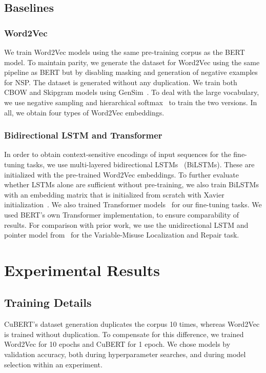 \documentclass{article}
\newcommand{\BERTforCode}{CuBERT\xspace}
\begin{document}
\subsection{Baselines}

\subsubsection{Word2Vec}
We train Word2Vec models using the same pre-training corpus as the BERT model. To maintain parity, we generate the dataset for Word2Vec using the same pipeline as BERT but by disabling masking and generation of negative examples for NSP. The dataset is generated without any duplication.
We train both CBOW and Skipgram models using GenSim~\citep{rehurek_lrec}. To deal with the large vocabulary, we use negative sampling and hierarchical softmax~\citep{DBLP:journals/corr/abs-1301-3781,NIPS2013_5021} to train the two versions. In all, we obtain four types of Word2Vec embeddings.

\subsubsection{Bidirectional LSTM and Transformer}
In order to obtain context-sensitive encodings of input sequences for the fine-tuning tasks, we use multi-layered bidirectional LSTMs~\citep{Hochreiter:1997:LSM:1246443.1246450} (BiLSTMs). These are initialized with the pre-trained Word2Vec embeddings. To further evaluate whether LSTMs alone are sufficient without pre-training, we also train BiLSTMs with an embedding matrix that is initialized from scratch with Xavier initialization~\citep{glorot2010understanding}. We also trained Transformer models~\citep{NIPS2017_7181} for our fine-tuning tasks. We used BERT's own Transformer implementation, to ensure comparability of results. {For comparison with prior work, we use the unidirectional LSTM and pointer model from~\citet{DBLP:journals/corr/abs-1904-01720} for the Variable-Misuse Localization and Repair task.}

\section{Experimental Results}

\subsection{Training Details}
\label{sec:training-details}

\BERTforCode's dataset generation duplicates the corpus \num{10} times, whereas Word2Vec is trained without duplication. To compensate for this difference, we trained Word2Vec for \num{10} epochs and \BERTforCode for \num{1} epoch. We chose models by validation accuracy, both during hyperparameter searches, and during model selection within an experiment.
\end{document}

